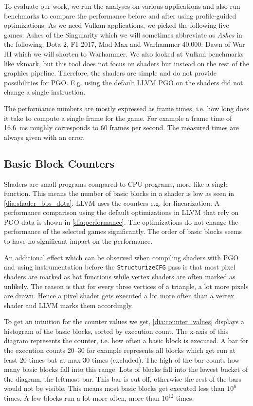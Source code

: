\clearpage
{}
To evaluate our work, we run the analyses on various applications and also run benchmarks to compare the performance before and after using profile-guided optimizations.
As we need Vulkan applications, we picked the following five games:
Ashes of the Singularity which we will sometimes abbreviate as \emph{Ashes} in the following, Dota 2, F1 2017, Mad Max and Warhammer 40,000: Dawn of War III which we will shorten to Warhammer.
We also looked at Vulkan benchmarks like vkmark, but this tool does not focus on shaders but instead on the rest of the graphics pipeline.
Therefore, the shaders are simple and do not provide possibilities for PGO. E.g. using the default LLVM PGO on the shaders did not change a single instruction.

The performance numbers are mostly expressed as frame times, i.e. how long does it take to compute a single frame for the game.
For example a frame time of \SI{16.6}{\milli\second} roughly corresponds to 60 frames per second.
The measured times are always given with an error.

\subsection{Basic Block Counters}
\label{sub:eval_counters}
Shaders are small programs compared to CPU programs, more like a single function. This means the number of basic blocks in a shader is low as seen in \cref{dia:shader_bbs_dota}.
LLVM uses the counters e.g. for linearization. A performance comparison using the default optimizations in LLVM that rely on PGO data is shown in \cref{dia:performance}.
The optimizations do not change the performance of the selected games significantly.
The order of basic blocks seems to have no significant impact on the performance.

An additional effect which can be observed when compiling shaders with PGO and using instrumentation before the \texttt{StructurizeCFG} pass is that most pixel shaders are marked as hot functions while vertex shaders are often marked as unlikely.
The reason is that for every three vertices of a triangle, a lot more pixels are drawn.
Hence a pixel shader gets executed a lot more often than a vertex shader and LLVM marks them accordingly.

To get an intuition for the counter values we get, \cref{dia:counter_values} displays a histogram of the basic blocks, sorted by execution count.
The x-axis of this diagram represents the counter, i.e. how often a basic block is executed.
A bar for the execution counts 20--30 for example represents all blocks which get run at least 20 times but at max 30 times (excluded).
The high of the bar counts how many basic blocks fall into this range.
Lots of blocks fall into the lowest bucket of the diagram, the leftmost bar. This bar is cut off, otherwise the rest of the bars would not be visible.
This means most basic blocks get executed less than $10^6$ times. A few blocks run a lot more often, more than $10^12$ times.

